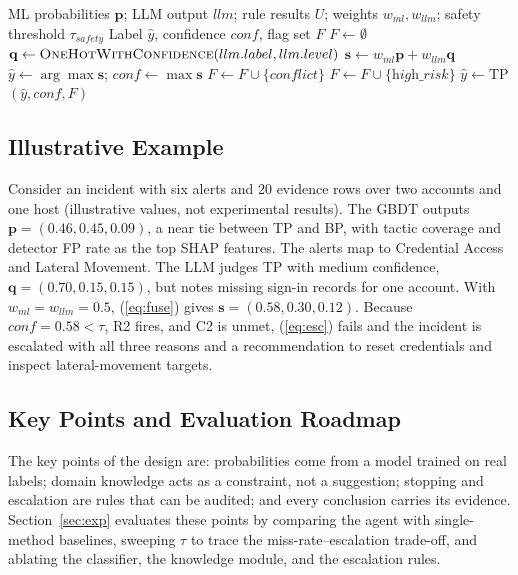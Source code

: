 \documentclass[conference]{IEEEtran}
\begin{document}
\begin{algorithm}[t]
\caption{FuseEvidence}
\label{alg:fuse}
\footnotesize
\begin{algorithmic}[1]
\Require ML probabilities $\mathbf{p}$; LLM output $llm$; rule results
$U$; weights $w_{ml}, w_{llm}$; safety threshold $\tau_{safety}$
\Ensure Label $\hat{y}$, confidence $conf$, flag set $F$
\State $F \gets \emptyset$
\State $\mathbf{q} \gets \textsc{OneHotWithConfidence}(llm.label, llm.level)$
\State $\mathbf{s} \gets w_{ml}\mathbf{p} + w_{llm}\mathbf{q}$
\State $\hat{y} \gets \arg\max \mathbf{s}$;\; $conf \gets \max \mathbf{s}$
 $F \gets F \cup \{\textit{conflict}\}$ \EndIf
{}
  \State $F \gets F \cup \{\textit{high\_risk}\}$
     $\hat{y} \gets \mathrm{TP}$ \EndIf
\EndIf
\State \Return $(\hat{y}, conf, F)$
\end{algorithmic}
\end{algorithm}

\subsection{Illustrative Example}
Consider an incident with six alerts and 20 evidence rows over two
accounts and one host (illustrative values, not experimental results).
The GBDT outputs $\mathbf{p}=(0.46,0.45,0.09)$, a near tie between TP
and BP, with tactic coverage and detector FP rate as the top SHAP
features. The alerts map to Credential Access and Lateral Movement. The
LLM judges TP with medium confidence, $\mathbf{q}=(0.70,0.15,0.15)$, but
notes missing sign-in records for one account. With
$w_{ml}=w_{llm}=0.5$, (\ref{eq:fuse}) gives $\mathbf{s}=(0.58,0.30,0.12)$.
Because $\mathit{conf}=0.58<\tau$, R2 fires, and C2 is unmet,
(\ref{eq:esc}) fails and the incident is escalated with all three
reasons and a recommendation to reset credentials and inspect
lateral-movement targets.

\subsection{Key Points and Evaluation Roadmap}
The key points of the design are: probabilities come from a model
trained on real labels; domain knowledge acts as a constraint, not a
suggestion; stopping and escalation are rules that can be audited; and
every conclusion carries its evidence.
Section~\ref{sec:exp} evaluates these points by comparing the agent
with single-method baselines, sweeping $\tau$ to trace the
miss-rate--escalation trade-off, and ablating the classifier, the
knowledge module, and the escalation rules.
\end{document}
